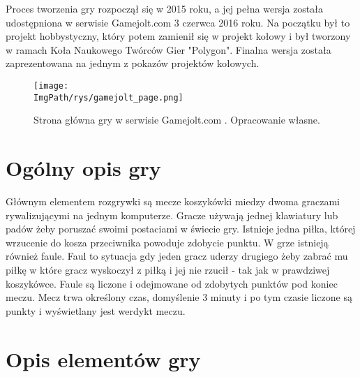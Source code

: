 \documentclass[a4paper,12pt,twoside,openany]{report}
\newcommand{\ImgPath}{.}
\begin{document}
Proces tworzenia gry rozpoczął się w 2015 roku, a jej pełna wersja została udostępniona w serwisie Gamejolt.com 3 czerwca 2016 roku\cite{gamejolt_page}. Na początku był to projekt hobbystyczny, który potem zamienił się w projekt kołowy i był tworzony w ramach Koła Naukowego Twórców Gier "Polygon". Finalna wersja została zaprezentowana na jednym z pokazów projektów kołowych.
\begin{figure}[!htbp]
	\begin{center}
\centering
\texttt{[image: \\ImgPath/rys/gamejolt\_page.png]}
\end{center}
	\caption{Strona główna gry w serwisie Gamejolt.com . Opracowanie własne.}
	\label{gamejolt_page}
\end{figure}

\section{Ogólny opis gry}
Głównym elementem rozgrywki są mecze koszykówki miedzy dwoma graczami rywalizującymi na jednym komputerze. Gracze używają jednej klawiatury lub padów żeby poruszać swoimi postaciami w świecie gry. Istnieje jedna piłka, której wrzucenie do kosza przeciwnika powoduje zdobycie punktu. W grze istnieją również faule. Faul to sytuacja gdy jeden gracz uderzy drugiego żeby zabrać mu piłkę  w które gracz wyskoczył z piłką i jej nie rzucił - tak jak w prawdziwej koszykówce. Faule są liczone i odejmowane od zdobytych punktów pod koniec meczu. Mecz trwa określony czas, domyślenie 3 minuty i po tym czasie liczone są punkty i wyświetlany jest werdykt meczu.

\section{Opis elementów gry}
\end{document}
